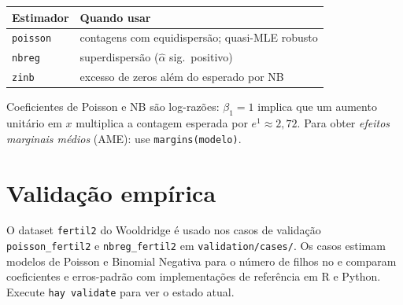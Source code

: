 \begin{center}
\begin{tabular}{ll}
\toprule
\textbf{Estimador} & \textbf{Quando usar} \\
\midrule
\texttt{poisson}  & contagens com equidispersão; quasi-MLE robusto \\
\texttt{nbreg}    & superdispersão ($\hat\alpha$ sig.\ positivo) \\
\texttt{zinb}     & excesso de zeros além do esperado por NB \\
\bottomrule
\end{tabular}
\end{center}

\begin{nota}
  Coeficientes de Poisson e NB são log-razões: $\beta_1 = 1$ implica que um
  aumento unitário em $x$ multiplica a contagem esperada por $e^1 \approx 2{,}72$.
  Para obter \emph{efeitos marginais médios} (AME): use
  \lstinline{margins(modelo)}.
\end{nota}

\section{Validação empírica}

O dataset \texttt{fertil2} do Wooldridge é usado nos casos de validação
\texttt{poisson_fertil2} e \texttt{nbreg_fertil2} em \texttt{validation/cases/}.
Os casos estimam modelos de Poisson e Binomial Negativa para o número de filhos
no \hayashi{} e comparam coeficientes e erros-padrão com implementações de
referência em R e Python. Execute \lstinline{hay validate} para ver o estado atual.
